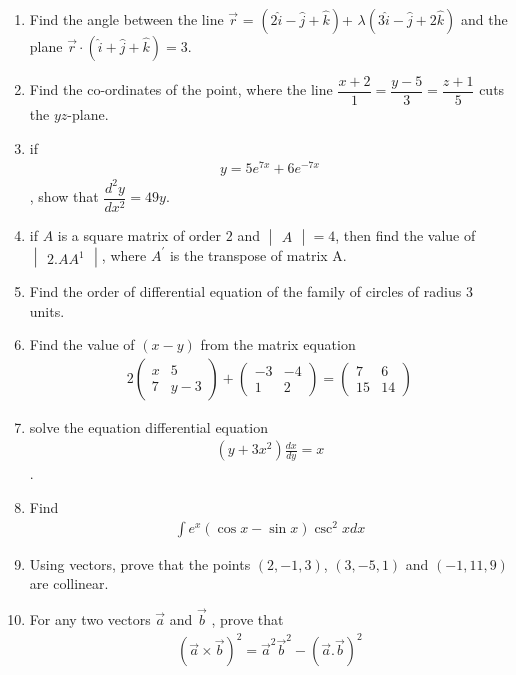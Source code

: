 \documentclass[12pt,-letter paper]{article}
\newcommand{\myvec}[1]{\ensuremath{\begin{pmatrix}#1\end{pmatrix}}}
\newcommand{\mydet}[1]{\ensuremath{\begin{vmatrix}#1\end{vmatrix}}}
\providecommand{\brak}[1]{\ensuremath{\left(#1\right)}}
\begin{document}
	\begin{enumerate}	
		\item  Find the angle between the line $\overrightarrow{r}$ = $\brak{2\hat{i}-\hat{j}+\hat{k}}$+ $\lambda\brak{3\hat{i}-\hat{j}+2\hat{k}}$ and the plane $\overrightarrow{r}\cdot\brak{\hat{i} +\hat{j}+\hat{k}}=3$.

\item Find the co-ordinates of the point, where the line $\dfrac{x+2}{1}=\dfrac{y-5}{3}=\dfrac{z+1}{5}$ cuts the $yz$-plane.

\item if \begin{align*}y= 5e^{7x}+6e^{-7x}\end{align*}  , show that $\dfrac{d^2y}{dx^2}=49y$.

	\item if $A$ is a square matrix of order $2$ and $\mydet{A}=4$, then find the value of $\mydet{2.AA^{1}}$, where $A^\prime$ is the transpose of matrix A.

\item Find the order of differential equation of the family of circles of radius $3$ units.

\item Find the value of $\brak{x-y}$ from the matrix equation 
	\begin{align*}
		2\myvec{x & 5\\7 & y-3}+\myvec{-3 & -4\\1 & 2}=\myvec{7 & 6\\15 & 14}
	\end{align*}	
	
\item solve the equation differential equation \begin{align*}\brak{y+3x^2}\frac{dx}{dy}=x\end{align*}.

	\item Find \begin{align*}\int e^x\brak{\cos x-\sin x}\csc^2 x dx\end{align*}

\item Using vectors, prove that the points $\brak{2,-1,3}$, $\brak{3,-5,1}$ and $\brak{-1,11,9}$ are collinear.

\item For any two vectors $\overrightarrow{a}$ and $\overrightarrow{b}$ , prove that \begin{align*}\brak{\overrightarrow{a} \times \overrightarrow{b}}^2=\overrightarrow{a}^2\overrightarrow{b}^2-\brak{\overrightarrow{a}.\overrightarrow{b}}^2\end{align*}


\end{enumerate}
\end{document}
